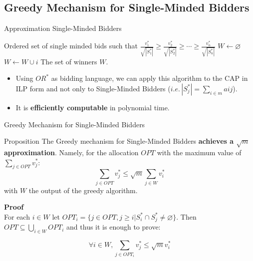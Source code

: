\documentclass[aspectratio=169,xcolor=dvipsnames]{beamer}
\begin{document}
    \subsection{Greedy Mechanism for Single-Minded Bidders}
    \begin{frame}{Approximation Single-Minded Bidders}
    
    \begin{algorithm}[H]
    \begin{algorithmic}[1]
    \REQUIRE Ordered set of single minded bids such that $\frac{v^{*}_{1}}{\sqrt{|S^{*}_{1}|}} \geq \frac{v^{*}_{2}}{\sqrt{|S^{*}_{2}|}} \geq \cdots \geq \frac{v^{*}_{n}}{\sqrt{|S^{*}_{n}|}}  $
    \STATE $W \leftarrow \varnothing $
    \STATE $W \leftarrow W \cup {i}     $
    \ENDIF
    \ENDFOR
    \ENSURE The set of winners $W$.
    \end{algorithmic}
    \caption{Greedy Mechanism for Single-Minded Bidders}
    \label{alg:seq}
    \end{algorithm}
    \vspace{-10pt}
    \begin{itemize}
        \item Using $OR^*$ as bidding language, we can apply this algorithm to the CAP in ILP form and not only to Single-Minded Bidders ($i.e. \hspace{2pt} |S^{*}_{j}|= \sum_{i \in m}aij $).
        \item It is \textbf{efficiently computable} in polynomial time. 
    \end{itemize}
    
    \end{frame}
    
    \begin{frame}{Greedy Mechanism for Single-Minded Bidders }
    \begin{block}{Proposition}
    The Greedy mechanism for Single-Minded Bidders \textbf{achieves a $\sqrt{m}$ approximation}. Namely, for the allocation $OPT$ with the maximum value of $\sum_{j \in OPT} v^{*}_{j}$:
    $$
    \sum_{j \in OPT} v^{*}_{j} \leq \sqrt{m} \sum_{j \in W} v^{*}_{i}
    $$
    with $W$ the output of the greedy algorithm.
    \end{block}

    \textbf{Proof} \\
    For each $i \in W$ let $OPT_{i}= \{ j \in OPT, j \geq i | S^{*}_{i} \cap S^{*}_{j}  \neq \varnothing \}$. Then $OPT \subseteq \bigcup_{i \in W} OPT_{i} $ and thus it is enough to prove: 
    
    $$\forall i \in W, \sum_{j \in OPT_{i}} v^{*}_{j} \leq \sqrt{m} v^{*}_{i}$$
    \end{frame}
    
\end{document}
